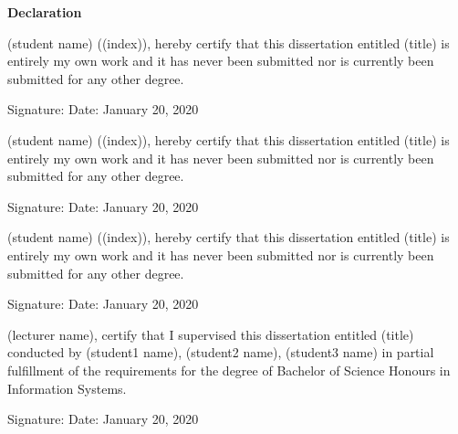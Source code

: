 \documentclass[12pt,a4paper]{report}
\begin{document}
\begin{center}
\textbf{\Large{Declaration}}\thispagestyle{empty}
\end{center}
\vspace{0.7cm}
\par

\noindent (student name) ((index)), hereby certify that this dissertation entitled (title) is
entirely my own work and it has never been submitted nor is currently been submitted for
any other degree.
\vspace{0.5cm}

\noindent 
Signature:
\vspace{0.3cm}
\newline
\noindent
Date: January 20, 2020
\vspace{2cm}

\noindent (student name) ((index)), hereby certify that this dissertation entitled (title) is
entirely my own work and it has never been submitted nor is currently been submitted for
any other degree.
\vspace{0.5cm}

\noindent 
Signature:
\vspace{0.3cm}
\newline
\noindent
Date: January 20, 2020
\vspace{2cm}

\noindent (student name) ((index)), hereby certify that this dissertation entitled (title) is
entirely my own work and it has never been submitted nor is currently been submitted for
any other degree.
\vspace{0.5cm}

\noindent 
Signature:
\vspace{0.3cm}
\newline
\noindent
Date: January 20, 2020
\vspace{2cm}

\newpage

\noindent (lecturer name), certify that I supervised this dissertation entitled (title)
conducted by (student1 name), (student2 name), (student3 name) in partial
fulfillment of the requirements for the degree of Bachelor of Science Honours in Information
Systems.
\vspace{0.5cm}

\noindent 
Signature:
\vspace{0.3cm}
\newline
\noindent
Date: January 20, 2020
\vspace{2cm}
\end{document}
